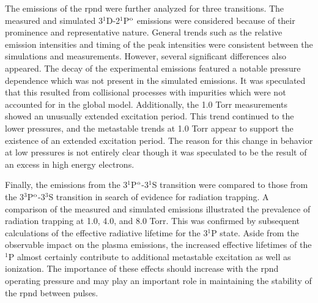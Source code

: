 The emissions of the \acs{rpnd} were further analyzed for three transitions. The
measured and simulated 3$^1$D-2$^1$P$^\mathrm{o}$ emissions were considered because of
their prominence and representative nature. General trends such as the relative
emission intensities and timing of the peak intensities were consistent between
the simulations and measurements. However, several significant differences also
appeared. The decay of the experimental emissions featured a notable pressure
dependence which was not present in the simulated emissions. It was speculated
that this resulted from collisional processes with impurities which were not
accounted for in the global model. Additionally, the 1.0 Torr measurements
showed an unusually extended excitation period. This trend continued to the
lower pressures, and the metastable trends at 1.0 Torr appear to support the
existence of an extended excitation period. The reason for this change in
behavior at low pressures is not entirely clear though it was speculated to be
the result of an excess in high energy electrons.

Finally, the emissions from the 3$^1$P$^\mathrm{o}$-3$^1$S transition were compared to
those from the 3$^3$P$^\mathrm{o}$-3$^3$S transition in search of evidence for
radiation trapping. A comparison of the measured and simulated emissions
illustrated the prevalence of radiation trapping at 1.0, 4.0, and 8.0 Torr. This
was confirmed by subsequent calculations of the effective radiative lifetime for
the 3$^1$P state. Aside from the observable impact on the plasma emissions,
the increased effective lifetimes of the $^1$P almost certainly contribute to
additional metastable excitation as well as ionization. The importance of these
effects should increase with the \acs{rpnd} operating pressure and may play an
important role in maintaining the stability of the \acs{rpnd} between pulses.
